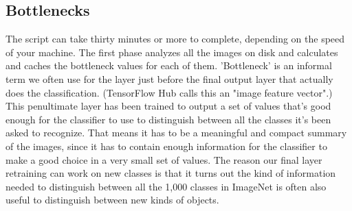 \subsection{Bottlenecks} The script can take thirty minutes or more to complete, depending on the
speed of your machine. The first phase analyzes all the images on disk and
calculates and caches the bottleneck values for each of them. 'Bottleneck'
is an informal term we often use for the layer just before the final output
layer that actually does the classification. (TensorFlow Hub calls this an
"image feature vector".) This penultimate layer has been trained to output
a set of values that's good enough for the classifier to use to distinguish
between all the classes it's been asked to recognize. That means it has to be
a meaningful and compact summary of the images, since it has to contain
enough information for the classifier to make a good choice in a very small
set of values. The reason our final layer retraining can work on new classes
is that it turns out the kind of information needed to distinguish between
all the 1,000 classes in ImageNet is often also useful to distinguish between
new kinds of objects.
